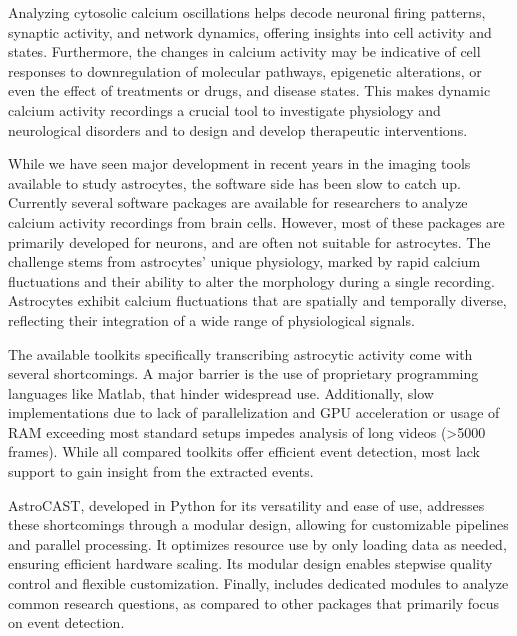 Analyzing cytosolic calcium oscillations helps decode neuronal firing patterns, synaptic activity, and network dynamics, offering insights into cell activity and states\citep{del_negro_sodium_2005,grienberger_imaging_2012,dombeck_imaging_2007}. Furthermore, the changes in calcium activity may be indicative of cell responses to downregulation of molecular pathways, epigenetic alterations, or even the effect of treatments or drugs, and disease states\citep{lines_astrocytes_2020,miller_calcium_2023,robil_glioblastoma_2015,huang_vitro_2013,britti_tau_2020,zhang_estrogen_2010}. This makes dynamic calcium activity recordings a crucial tool to investigate physiology and neurological disorders and to design and develop therapeutic interventions.

While we have seen major development in recent years in the imaging tools available to study astrocytes, the software side has been slow to catch up\citep{gorzo_photonics_2022,aryal_er-gcamp6f_2022,stobart_cortical_2018}. Currently several software packages are available for researchers to analyze calcium activity recordings from brain cells. However, most of these packages are primarily developed for neurons, and are often not suitable for astrocytes. The challenge stems from astrocytes' unique physiology, marked by rapid  calcium fluctuations\citep{stobart_long-term_2018,curreli_complementary_2022} and their ability to alter the morphology during a single recording\citep{anders_epileptic_2024,baorto_astrocyte_1992}. Astrocytes exhibit calcium fluctuations that are spatially and temporally diverse, reflecting their integration of a wide range of physiological signals\citep{semyanov_making_2020,smedler_frequency_2014,denizot_simulation_2019,papouin_astrocytic_2017,bazargani_astrocyte_2016}.

The available toolkits specifically transcribing astrocytic activity come with several shortcomings. A major barrier is the use of proprietary programming languages like Matlab, that hinder widespread use. Additionally, slow implementations due to lack of parallelization and \ac{GPU} acceleration or usage of RAM exceeding most standard setups impedes analysis of long videos (>5000 frames). While all compared toolkits offer efficient event detection, most lack support to gain insight from the extracted events.

AstroCAST, developed in Python for its versatility and ease of use, addresses these shortcomings through a modular design, allowing for customizable pipelines and parallel processing. It optimizes resource use by only loading data as needed, ensuring efficient hardware scaling. Its modular design enables stepwise quality control and flexible customization. Finally,  includes dedicated modules to analyze common research questions, as compared to other packages that primarily focus on event detection.

